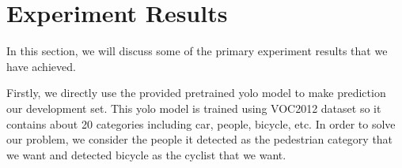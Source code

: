 \section{Experiment Results}
In this section, we will discuss some of the primary experiment results that we have achieved.

Firstly, we directly use the provided pretrained yolo model to make prediction our development set. This yolo model is trained using VOC2012 dataset so it contains about 20 categories including car, people, bicycle, etc. In order to solve our problem, we consider the people it detected as the pedestrian category that we want and detected bicycle as the cyclist that we want.